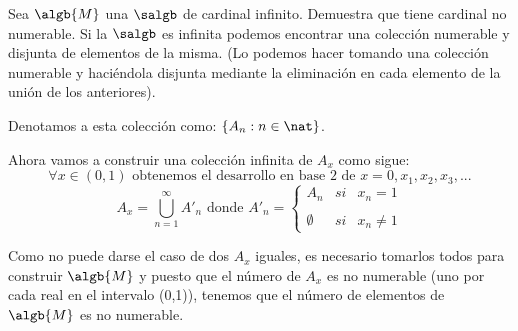 \begin{problem}[10]
Sea $\algb{M}$ una $\salgb$ de cardinal infinito. Demuestra que tiene cardinal no numerable.
\solution
Si la $\salgb$ es infinita podemos encontrar una colección numerable y disjunta de elementos de la misma. (Lo podemos hacer tomando una colección numerable y haciéndola disjunta mediante la eliminación en cada elemento de la unión de los anteriores).

Denotamos a esta colección como: $\{A_n:n\in \nat\}$. 

Ahora vamos a construir una colección infinita de $A_x$ como sigue:
\[\forall x \in (0,1) \text{ obtenemos el desarrollo en base 2 de } x=0,x_1,x_2,x_3,...\]
\[A_x=\bigcup_{n=1}^{\infty}A'_n \text{ donde } A'_n=\left\{ \begin{array}{lcc}
             A_n &   si  & x_n = 1 \\
             \\ \emptyset &  si  & x_n \neq 1
             \end{array}
   \right.\]

Como no puede darse el caso de dos $A_x$ iguales, es necesario tomarlos todos para construir $\algb{M}$ y puesto que el número de $A_x$ es no numerable (uno por cada real en el intervalo (0,1)), tenemos que el número de elementos de $\algb{M}$ es no numerable.

\end{problem}

